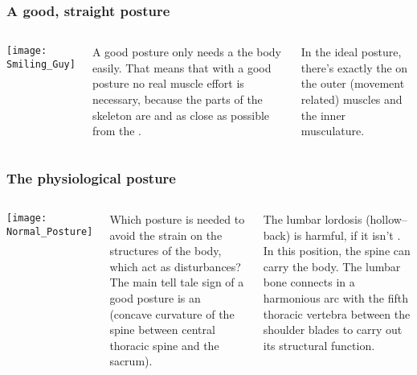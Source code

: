 \begin{frame}
\frametitle{A good, straight posture}
\begin{columns}[c] %


\texttt{[image: Smiling\_Guy]}

A good posture only needs a  the body easily. That means that with a good posture no real muscle effort is necessary, because the parts of the skeleton are  and as close as possible from the . 

In the ideal posture, there's exactly the  on the outer (movement related) muscles and the inner musculature.
\end{columns}

\end{frame}
\begin{frame}
\frametitle{The physiological posture}
\begin{columns}[c] %


\texttt{[image: Normal\_Posture]}

Which posture is needed to avoid the strain on the structures of the body, which act as disturbances? The main tell tale sign of a good posture is an  (concave curvature of the spine between central thoracic spine and the sacrum).

The lumbar lordosis (hollow--back) is harmful, if it isn't . In this position, the spine can carry the body. The lumbar bone connects in a harmonious arc with the fifth thoracic vertebra between the shoulder blades to carry out its structural function.
\end{columns}

\end{frame}
